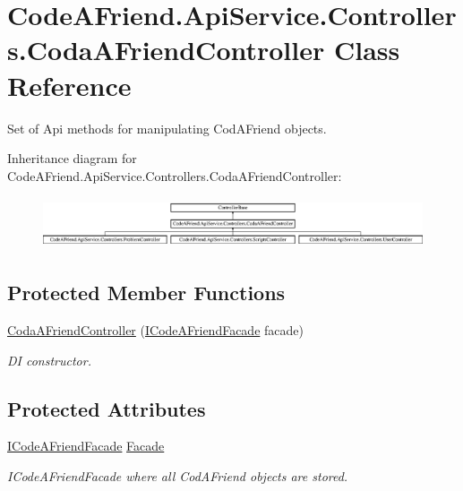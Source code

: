 \hypertarget{class_code_a_friend_1_1_api_service_1_1_controllers_1_1_coda_a_friend_controller}{}\section{Code\+A\+Friend.\+Api\+Service.\+Controllers.\+Coda\+A\+Friend\+Controller Class Reference}
\label{class_code_a_friend_1_1_api_service_1_1_controllers_1_1_coda_a_friend_controller}


Set of Api methods for manipulating Cod\+A\+Friend objects.  


Inheritance diagram for Code\+A\+Friend.\+Api\+Service.\+Controllers.\+Coda\+A\+Friend\+Controller\+:\begin{figure}[H]
\begin{center}
\leavevmode
\includegraphics[height=1.534247cm]{class_code_a_friend_1_1_api_service_1_1_controllers_1_1_coda_a_friend_controller}
\end{center}
\end{figure}
\subsection*{Protected Member Functions}
\begin{DoxyCompactItemize}
\item 
\mbox{\hyperlink{class_code_a_friend_1_1_api_service_1_1_controllers_1_1_coda_a_friend_controller_ab39f44a0cbe572d4e3a7a94634b2c199}{Coda\+A\+Friend\+Controller}} (\mbox{\hyperlink{interface_code_a_friend_1_1_facade_1_1_i_code_a_friend_facade}{I\+Code\+A\+Friend\+Facade}} facade)
\begin{DoxyCompactList}\small\item\em DI constructor. \end{DoxyCompactList}\end{DoxyCompactItemize}
\subsection*{Protected Attributes}
\begin{DoxyCompactItemize}
\item 
\mbox{\hyperlink{interface_code_a_friend_1_1_facade_1_1_i_code_a_friend_facade}{I\+Code\+A\+Friend\+Facade}} \mbox{\hyperlink{class_code_a_friend_1_1_api_service_1_1_controllers_1_1_coda_a_friend_controller_a5a9aff99d4e9ba347547fc3a5ae26b18}{Facade}}
\begin{DoxyCompactList}\small\item\em I\+Code\+A\+Friend\+Facade where all Cod\+A\+Friend objects are stored. \end{DoxyCompactList}\end{DoxyCompactItemize}


